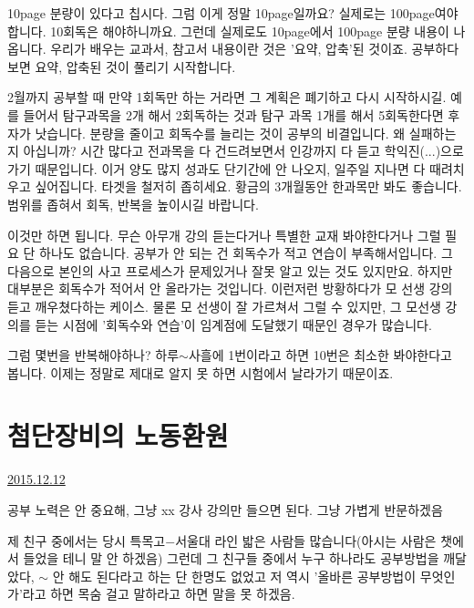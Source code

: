 10page 분량이 있다고 칩시다. 그럼 이게 정말 10page일까요?
실제로는 100page여야합니다. 10회독은 해야하니까요. 그런데 실제로도 10page에서 100page 분량 내용이 나옵니다.
우리가 배우는 교과서, 참고서 내용이란 것은 '요약, 압축'된 것이죠. 공부하다보면 요약, 압축된 것이 풀리기 시작합니다.
\vspace{5mm}

2월까지 공부할 때 만약 1회독만 하는 거라면 그 계획은 폐기하고 다시 시작하시길.
예를 들어서 탐구과목을 2개 해서 2회독하는 것과 탐구 과목 1개를 해서 5회독한다면 후자가 낫습니다.
분량을 줄이고 회독수를 늘리는 것이 공부의 비결입니다.
왜 실패하는지 아십니까? 시간 많다고 전과목을 다 건드려보면서 인강까지 다 듣고 학익진(...)으로 가기 때문입니다.
이거 양도 많지 성과도 단기간에 안 나오지, 일주일 지나면 다 때려치우고 싶어집니다.
타겟을 철저히 좁히세요. 황금의 3개월동안 한과목만 봐도 좋습니다. 범위를 좁혀서 회독, 반복을 높이시길 바랍니다.
\vspace{5mm}

이것만 하면 됩니다. 무슨 아무개 강의 듣는다거나 특별한 교재 봐야한다거나 그럴 필요 단 하나도 없습니다.
공부가 안 되는 건 회독수가 적고 연습이 부족해서입니다. 그 다음으로 본인의 사고 프로세스가 문제있거나 잘못 알고 있는 것도 있지만요.
하지만 대부분은 회독수가 적어서 안 올라가는 것입니다.
이런저런 방황하다가 모 선생 강의 듣고 깨우쳤다하는 케이스.
물론 모 선생이 잘 가르쳐서 그럴 수 있지만, 그 모선생 강의를 듣는 시점에 '회독수와 연습'이 임계점에 도달했기 때문인 경우가 많습니다.
\vspace{5mm}

그럼 몇번을 반복해야하나?
하루$\sim$사흘에 1번이라고 하면 10번은 최소한 봐야한다고 봅니다.
이제는 정말로 제대로 알지 못 하면 시험에서 날라가기 때문이죠.
\vspace{5mm}







\section{첨단장비의 노동환원}
\href{https://www.kockoc.com/Apoc/540961}{2015.12.12}

\vspace{5mm}

공부 노력은 안 중요해, 그냥 xx 강사 강의만 들으면 된다.
그냥 가볍게 반문하겠음
\vspace{5mm}

제 친구 중에서는 당시 특목고$-$서울대 라인 밟은 사람들 많습니다(아시는 사람은 챗에서 들었을 테니 말 안 하겠음)
그런데 그 친구들 중에서 누구 하나라도 공부방법을 깨달았다, $\sim$ 안 해도 된다라고 하는 단 한명도 없었고
저 역시 '올바른 공부방법이 무엇인가'라고 하면 목숨 걸고 말하라고 하면 말을 못 하겠음.
\vspace{5mm}


